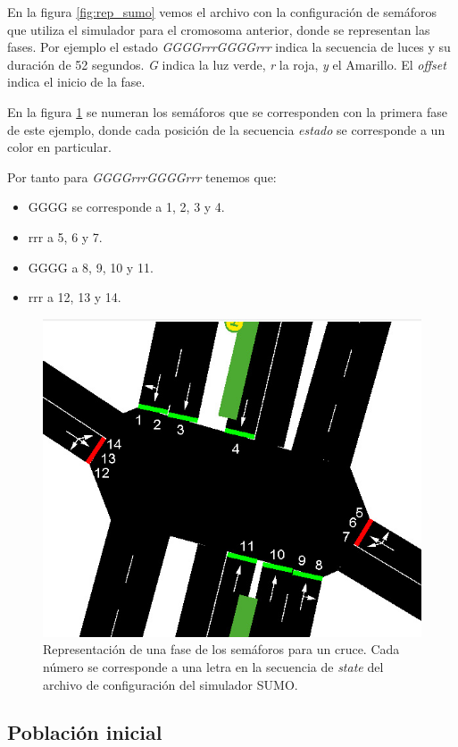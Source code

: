 En la figura \ref{fig:rep_sumo} vemos el archivo con la configuración de semáforos que utiliza el simulador para el cromosoma anterior, donde se representan las fases. Por ejemplo el estado \emph{GGGGrrrGGGGrrr} indica la secuencia de luces y su duración de 52 segundos. \emph{G} indica la luz verde, \emph{r} la roja, \emph{y} el Amarillo. El \emph{offset} indica el inicio de la fase. 

En la figura \ref{fig:sem_numerados} se numeran los semáforos que se corresponden con la primera fase de este ejemplo, donde cada posición de la secuencia \emph{estado} se corresponde a un color en particular. 

\newpage
Por tanto para \emph{GGGGrrrGGGGrrr} tenemos que:
\begin{itemize}
\item GGGG se corresponde a 1, 2, 3 y 4. 
\item rrr a 5, 6 y 7. 
\item GGGG a 8, 9, 10 y 11. 
\item rrr a 12, 13 y 14. 
\end{itemize}
  
\begin{figure}[H]
	\centering
	\includegraphics[width=0.7\linewidth]{Figures/semaforos_numerado}
	\caption{Representación de una fase de los semáforos para un cruce. Cada número se corresponde a una letra en la secuencia de \emph{state} del archivo de configuración del simulador SUMO.}
	\label{fig:sem_numerados}
\end{figure}

\subsection{Población inicial}

